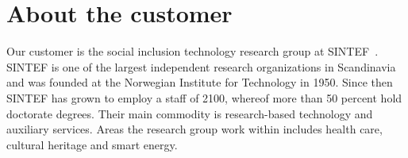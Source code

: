 \section{About the customer}

Our customer is the social inclusion technology research group at SINTEF~\cite{sintef}. SINTEF is one of the largest independent research organizations in Scandinavia and was founded at the Norwegian Institute for Technology in 1950. Since then SINTEF has grown to employ a staff of 2100, whereof more than 50 percent hold doctorate degrees. Their main commodity is research-based technology and auxiliary services. Areas the research group work within includes health care, cultural heritage and smart energy.

